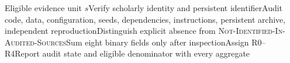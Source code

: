 \begin{algorithm}[H]\caption{Artifact Reproducibility Audit}\label{alg:reproaudit}\begin{algorithmic}[1]\Require Eligible evidence unit $s$\State Verify scholarly identity and persistent identifier\State Audit code, data, configuration, seeds, dependencies, instructions, persistent archive, independent reproduction\State Distinguish explicit absence from \textsc{Not-Identified-In-Audited-Sources}\State Sum eight binary fields only after inspection\State Assign R0--R4\State Report audit state and eligible denominator with every aggregate\end{algorithmic}\end{algorithm}